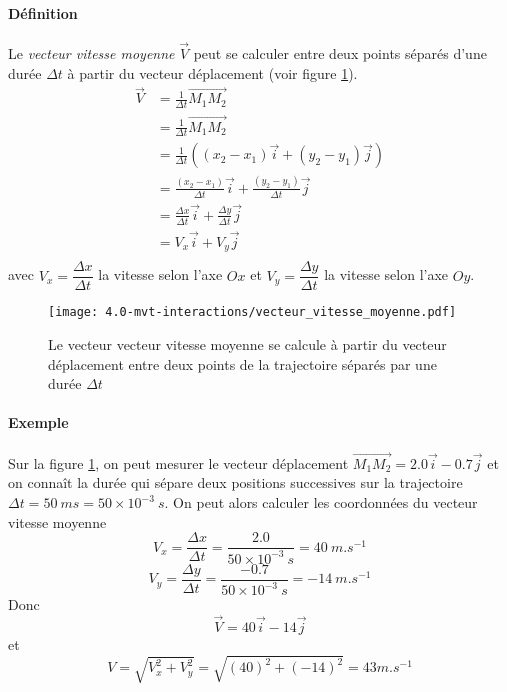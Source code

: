 \paragraph{Définition} Le \textit{vecteur vitesse moyenne} $\overrightarrow V$ peut se calculer 
entre deux points séparés d'une durée $\Delta t$ à partir du vecteur déplacement (voir figure \ref{fig:vecteur_vitesse_moyenne}).
\begin{equation*}
  \begin{aligned}
    \overrightarrow{V}    & =  \frac{1}{\Delta t} \overrightarrow{M_1M_2} \\
			  & =  \frac{1}{\Delta t} \overrightarrow{M_1M_2} \\
			  & =  \frac{1}{\Delta t} \left( (x_2-x_1) \overrightarrow{i} + (y_2-y_1) \overrightarrow{j} \right) \\
			  & =  \frac{(x_2-x_1)}{\Delta t} \overrightarrow{i} + \frac{(y_2-y_1)}{\Delta t} \overrightarrow{j}  \\
			  & =  \frac{\Delta x}{\Delta t} \overrightarrow{i} + \frac{\Delta y}{\Delta t} \overrightarrow{j}  \\
			  & =  V_x \overrightarrow{i} + V_y \overrightarrow{j} \\
  \end{aligned} 
\end{equation*}
avec $V_x = \dfrac{\Delta x}{\Delta t}$ la vitesse selon l'axe $Ox$ et $V_y = \dfrac{\Delta y}{\Delta t}$ la vitesse selon l'axe $Oy$.

\begin{figure}[h!]
  \begin{center}
      \texttt{[image: 4.0-mvt-interactions/vecteur\_vitesse\_moyenne.pdf]}
  \end{center}
  \caption{Le vecteur vecteur vitesse moyenne se calcule à partir du vecteur déplacement entre deux points de la trajectoire séparés par une durée $\Delta t$}
  \label{fig:vecteur_vitesse_moyenne}
\end{figure}

\paragraph{Exemple} Sur la figure \ref{fig:vecteur_vitesse_moyenne}, on peut mesurer le vecteur déplacement  $\overrightarrow{M_1M_2} = 2.0 \overrightarrow{i} - 0.7 \overrightarrow {j} $ et on connaît la durée qui sépare deux positions successives sur la trajectoire $\Delta t =  50~ms = 50 \times 10^{-3}~s$. On peut alors calculer les coordonnées du vecteur vitesse moyenne 
$$V_x = \dfrac{\Delta x}{\Delta t} = \dfrac{2.0}{50 \times 10^{-3}~s} = 40~m.s^{-1} $$
$$V_y = \dfrac{\Delta y}{\Delta t} = \dfrac{-0.7}{50 \times 10^{-3}~s} = -14~m.s^{-1} $$
Donc 
$$\overrightarrow{V} = 40 \overrightarrow{i} - 14 \overrightarrow{j}$$
et $$ V = \sqrt{V_x^2 + V_y^2} = \sqrt{(40)^2 + (-14)^2} = 43 m.s^{-1}$$



